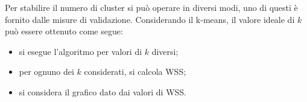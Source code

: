 \documentclass{subfiles}
\begin{document}
Per stabilire il numero di cluster si può operare in diversi modi, uno di questi è fornito dalle misure di validazione.
Considerando il k-means, il valore ideale di $k$ può essere ottenuto come segue:
\begin{itemize}
    \item si esegue l'algoritmo per valori di $k$ diversi;
    \item per ognuno dei $k$ considerati, si calcola WSS;
    \item si considera il grafico dato dai valori di WSS.
\end{itemize}
\end{document}
